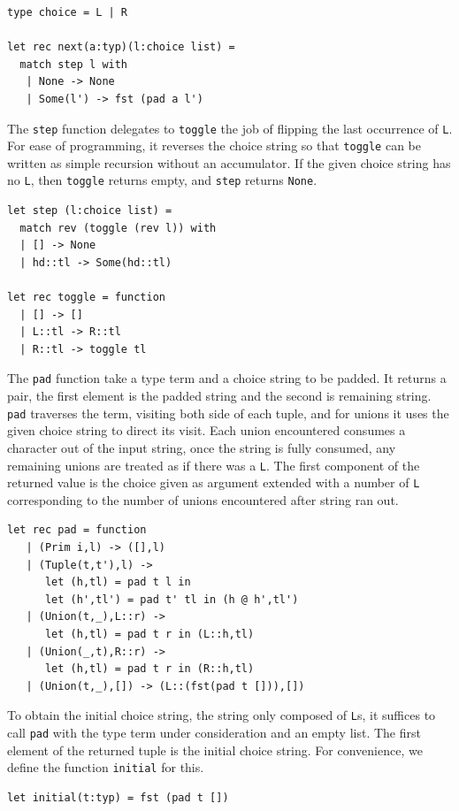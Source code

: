 \documentclass[a4paper,english]{lipics-v2019}
\renewcommand{\L}{{\tt L}\xspace}
\newcommand{\Ls}{{\tt L}s\xspace}
\renewcommand{\c}[1]{\lstinline{#1}\xspace}
\begin{document}
\begin{lstlisting}
type choice = L | R

let rec next(a:typ)(l:choice list) = 
  match step l with
   | None -> None
   | Some(l') -> fst (pad a l')
\end{lstlisting}

The \c{step} function delegates to \c{toggle} the job of flipping the last
occurrence of \L. For ease of programming, it reverses the choice string so
that \c{toggle} can be written as simple recursion without an accumulator.
If the given choice string has no \L, then \c{toggle} returns empty, and
\c{step} returns \c{None}.

\begin{lstlisting}
let step (l:choice list) =
  match rev (toggle (rev l)) with
  | [] -> None
  | hd::tl -> Some(hd::tl)

let rec toggle = function
  | [] -> []    
  | L::tl -> R::tl
  | R::tl -> toggle tl
\end{lstlisting}

The \c{pad} function take a type term and a choice string to be padded. It
returns a pair, the first element is the padded string and the second is
remaining string. \c{pad} traverses the term, visiting both side of each
tuple, and for unions it uses the given choice string to direct its visit.
Each union encountered consumes a character out of the input string, once
the string is fully consumed, any remaining unions are treated as if there
was a \L. The first component of the returned value is the choice given as
argument extended with a number of \L corresponding to the number of unions
encountered after string ran out.

\begin{lstlisting}
let rec pad = function
   | (Prim i,l) -> ([],l)
   | (Tuple(t,t'),l) -> 
      let (h,tl) = pad t l in
      let (h',tl') = pad t' tl in (h @ h',tl')
   | (Union(t,_),L::r) -> 
      let (h,tl) = pad t r in (L::h,tl)
   | (Union(_,t),R::r) -> 
      let (h,tl) = pad t r in (R::h,tl)
   | (Union(t,_),[]) -> (L::(fst(pad t [])),[])
\end{lstlisting}

To obtain the initial choice string, the string only composed of \Ls, it
suffices to call \c{pad} with the type term under consideration and an empty
list. The first element of the returned tuple is the initial choice
string. For convenience, we define the function \c{initial} for this.

\begin{lstlisting}
let initial(t:typ) = fst (pad t [])
\end{lstlisting}
\end{document}
